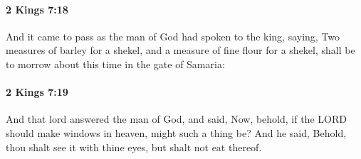 		\paragraph{2 Kings 7:18} %
			\label{2KINGS-7-18}

			And it came to pass as the man of God had spoken to the king, saying, Two measures of barley for a shekel, and a measure of fine flour for a shekel, shall be to morrow about this time in the gate of Samaria:


		\paragraph{2 Kings 7:19} %
			\label{2KINGS-7-19}

			And that lord answered the man of God, and said, Now, behold, if the LORD should make windows in heaven, might such a thing be? And he said, Behold, thou shalt see it with thine eyes, but shalt not eat thereof.

